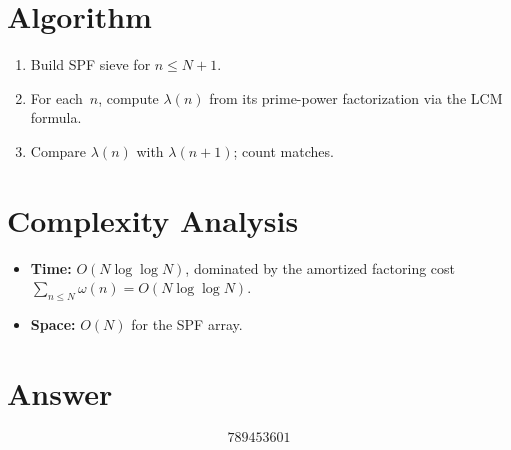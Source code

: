 \documentclass[11pt]{article}
\begin{document}
\section{Algorithm}

\begin{enumerate}
\item Build SPF sieve for $n \le N + 1$.
\item For each~$n$, compute $\lambda(n)$ from its prime-power factorization via the LCM formula.
\item Compare $\lambda(n)$ with $\lambda(n+1)$; count matches.
\end{enumerate}

\section{Complexity Analysis}

\begin{itemize}
\item \textbf{Time:} $O(N\log\log N)$, dominated by the amortized factoring cost $\sum_{n\le N}\omega(n) = O(N\log\log N)$.
\item \textbf{Space:} $O(N)$ for the SPF array.
\end{itemize}

\section{Answer}

\[
\boxed{789453601}
\]
\end{document}
